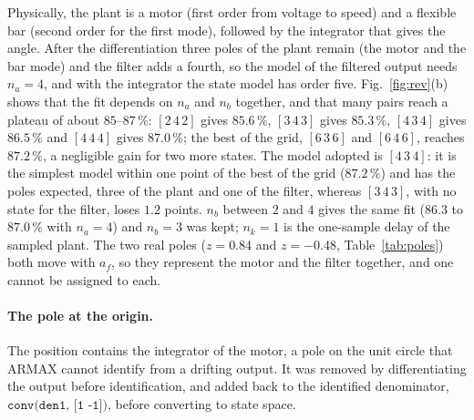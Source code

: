\documentclass[a4paper,11pt]{article}
\begin{document}
Physically, the plant is a motor (first order from voltage to speed) and a flexible bar (second order for the first mode), followed by the integrator that gives the angle.
After the differentiation three poles of the plant remain (the motor and the bar mode) and the filter adds a fourth, so the model of the filtered output needs $n_a=4$, and with the integrator the state model has order five.
Fig.~\ref{fig:rev}(b) shows that the fit depends on $n_a$ and $n_b$ together, and that many pairs reach a plateau of about $85$--$87\,\%$: $[2\,4\,2]$ gives $85.6\,\%$, $[3\,4\,3]$ gives $85.3\,\%$, $[4\,3\,4]$ gives $86.5\,\%$ and $[4\,4\,4]$ gives $87.0\,\%$; the best of the grid, $[6\,3\,6]$ and $[6\,4\,6]$, reaches $87.2\,\%$, a negligible gain for two more states.
The model adopted is $[4\,3\,4]$: it is the simplest model within one point of the best of the grid ($87.2\,\%$) and has the poles expected, three of the plant and one of the filter, whereas $[3\,4\,3]$, with no state for the filter, loses $1.2$ points.
$n_b$ between $2$ and $4$ gives the same fit ($86.3$ to $87.0\,\%$ with $n_a=4$) and $n_b=3$ was kept; $n_k=1$ is the one-sample delay of the sampled plant.
The two real poles ($z=0.84$ and $z=-0.48$, Table~\ref{tab:poles}) both move with $a_f$, so they represent the motor and the filter together, and one cannot be assigned to each.

\paragraph{The pole at the origin.}
The position contains the integrator of the motor, a pole on the unit circle that ARMAX cannot identify from a drifting output.
It was removed by differentiating the output before identification, and added back to the identified denominator, $\texttt{conv(den1, [1 -1])}$, before converting to state space.
\end{document}
